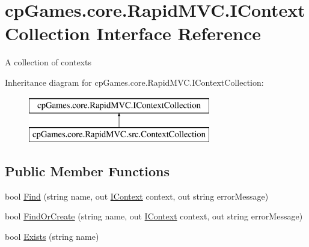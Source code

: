 \hypertarget{interfacecp_games_1_1core_1_1_rapid_m_v_c_1_1_i_context_collection}{}\section{cp\+Games.\+core.\+Rapid\+M\+V\+C.\+I\+Context\+Collection Interface Reference}
\label{interfacecp_games_1_1core_1_1_rapid_m_v_c_1_1_i_context_collection}


A collection of contexts  


Inheritance diagram for cp\+Games.\+core.\+Rapid\+M\+V\+C.\+I\+Context\+Collection\+:\begin{figure}[H]
\begin{center}
\leavevmode
\includegraphics[height=2.000000cm]{interfacecp_games_1_1core_1_1_rapid_m_v_c_1_1_i_context_collection}
\end{center}
\end{figure}
\subsection*{Public Member Functions}
\begin{DoxyCompactItemize}
\item 
bool \mbox{\hyperlink{interfacecp_games_1_1core_1_1_rapid_m_v_c_1_1_i_context_collection_a69e776a5c412ae0659e9df5e208ec374}{Find}} (string name, out \mbox{\hyperlink{interfacecp_games_1_1core_1_1_rapid_m_v_c_1_1_i_context}{I\+Context}} context, out string error\+Message)
\item 
bool \mbox{\hyperlink{interfacecp_games_1_1core_1_1_rapid_m_v_c_1_1_i_context_collection_a559611a4cf5c1fc2b00fbc34cbb7a9bc}{Find\+Or\+Create}} (string name, out \mbox{\hyperlink{interfacecp_games_1_1core_1_1_rapid_m_v_c_1_1_i_context}{I\+Context}} context, out string error\+Message)
\item 
bool \mbox{\hyperlink{interfacecp_games_1_1core_1_1_rapid_m_v_c_1_1_i_context_collection_a341363d37ac179e4b157d97f6e69404f}{Exists}} (string name)
\end{DoxyCompactItemize}
